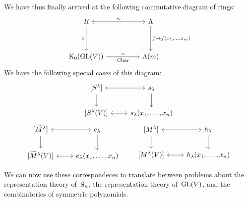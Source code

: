 \documentclass[a4paper,10pt]{scrartcl}
\begin{document}
We have thus finally arrived at the following commutative diagram of rings:
\[
  \begin{tikzcd}[sep = huge]
    R
    \arrow[leftrightarrow]{r}{\sim}
    \arrow{d}[left]{\Schur}
    &
    \Lambda
    \arrow{d}[right]{f \mapsto f(x_1, \dotsc, x_m)}
    \\
    \K_0(\GL(V))
    \arrow{r}[above]{\sim}[below]{\Char}
    &
    \Lambda(m)
  \end{tikzcd}
\]
We have the following special cases of this diagram:
\begin{gather*}
  \begin{tikzcd}[ampersand replacement = \&]
    {[S^\lambda]}
    \arrow[leftrightarrow]{r}
    \arrow{d}
    \&
    s_\lambda
    \arrow{d}
    \\
    {[S^\lambda(V)]}
    \arrow[leftrightarrow]{r}
    \&
    s_\lambda(x_1, \dotsc, x_n)
  \end{tikzcd}
  \\
  \begin{tikzcd}[ampersand replacement = \&]
    {[\widetilde{M}^\lambda]}
    \arrow[leftrightarrow]{r}
    \arrow{d}
    \&
    e_\lambda
    \arrow{d}
    \\
    {[\widetilde{M}^\lambda(V)]}
    \arrow[leftrightarrow]{r}
    \&
    e_\lambda(x_1, \dotsc, x_n)
  \end{tikzcd}
  \qquad
  \begin{tikzcd}[ampersand replacement = \&]
    {[M^\lambda]}
    \arrow[leftrightarrow]{r}
    \arrow{d}
    \&
    h_\lambda
    \arrow{d}
    \\
    {[M^\lambda(V)]}
    \arrow[leftrightarrow]{r}
    \&
    h_\lambda(x_1, \dotsc, x_n)
  \end{tikzcd}
\end{gather*}

We can now use these correspondeces to translate between problems about the representation theory of~$\operatorname{S}_n$, the representation theory of~$\operatorname{GL}(V)$, and the combinatorics of symmetric polynomials.
\end{document}
